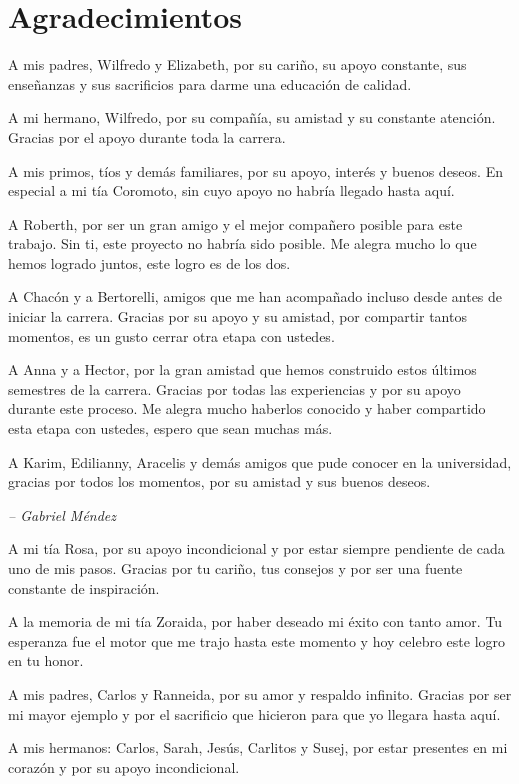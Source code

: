 \chapter*{Agradecimientos}

A mis padres, Wilfredo y Elizabeth, por su cariño, su apoyo constante, sus enseñanzas y sus sacrificios para darme una educación de calidad.

A mi hermano, Wilfredo, por su compañía, su amistad y su constante atención. Gracias por el apoyo durante toda la carrera.

A mis primos, tíos y demás familiares, por su apoyo, interés y buenos deseos. En especial a mi tía Coromoto, sin cuyo apoyo no habría llegado hasta aquí.

A Roberth, por ser un gran amigo y el mejor compañero posible para este trabajo. Sin ti, este proyecto no habría sido posible. Me alegra mucho lo que hemos logrado juntos, este logro es de los dos.

A Chacón y a Bertorelli, amigos que me han acompañado incluso desde antes de iniciar la carrera. Gracias por su apoyo y su amistad, por compartir tantos momentos, es un gusto cerrar otra etapa con ustedes.

A Anna y a Hector, por la gran amistad que hemos construido estos últimos semestres de la carrera. Gracias por todas las experiencias y por su apoyo durante este proceso. Me alegra mucho haberlos conocido y haber compartido esta etapa con ustedes, espero que sean muchas más.

A Karim, Edilianny, Aracelis y demás amigos que pude conocer en la universidad, gracias por todos los momentos, por su amistad y sus buenos deseos.

\begin{flushright}
    \textit{-- Gabriel Méndez}
\end{flushright}

A mi tía Rosa, por su apoyo incondicional y por estar siempre pendiente de cada uno de mis pasos. Gracias por tu cariño, tus consejos y por ser una fuente constante de inspiración.

A la memoria de mi tía Zoraida, por haber deseado mi éxito con tanto amor. Tu esperanza fue el motor que me trajo hasta este momento y hoy celebro este logro en tu honor.

A mis padres, Carlos y Ranneida, por su amor y respaldo infinito. Gracias por ser mi mayor ejemplo y por el sacrificio que hicieron para que yo llegara hasta aquí.

A mis hermanos: Carlos, Sarah, Jesús, Carlitos y Susej, por estar presentes en mi corazón y por su apoyo incondicional.

